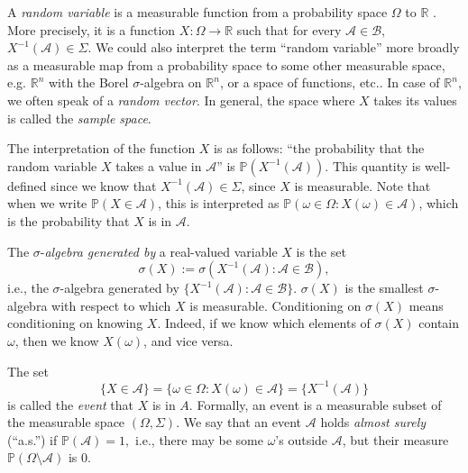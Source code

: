 \documentclass[11pt]{article}
\theoremstyle{plain}
\theoremstyle{definition}
\newtheorem{example}{Example}[section]
\newcommand{\reals}{\mathbb{R}}
\newcommand{\A}{\mathcal{A}}
\newcommand{\pr}{\mathbb{P}}
\newcommand{\citp}{\citep}
\begin{document}
A \emph{random variable} is a measurable function from a probability space $\Omega$ to  $\reals$ \citp{spreij2023measure}. More precisely, it is a function $X: \Omega \rightarrow \reals$ such that for every $\mathcal{A}\in \mathcal{B}$, $X^{-1}( \mathcal{A})\in \Sigma$. We could also interpret the term ``random variable'' more broadly as a measurable map from a probability space to some other measurable space, e.g. $\reals^n$ with the Borel $\sigma$-algebra on  $\reals^n$, or a space of functions, etc..  In case of $\reals^n$, we often speak of a \emph{random vector}. In general, the space where $X$ takes its values is called the \emph{sample space}. %

The interpretation of the function $X$ is as follows:  ``the probability that the random variable $X$ takes a value in $\mathcal{A}$'' is $\pr(X^{-1}( \mathcal{A}))$. This quantity is well-defined since we know that $X^{-1}( \mathcal{A}) \in \Sigma$, since $X$ is measurable. Note that when we write $\pr(X\in \mathcal{A})$, this is interpreted as $\pr(\omega\in \Omega: X(\omega)\in \mathcal{A})$, which is the probability that $X$ is in $\mathcal{A}$.

The $\sigma$-\emph{algebra generated by} a real-valued variable $X$ is the set 
$$\sigma(X):=\sigma(X^{-1}(\mathcal{A}): \mathcal{A}\in \mathcal{B}),$$
i.e., the $\sigma$-algebra generated by $\{X^{-1}(\mathcal{A}): \mathcal{A}\in \mathcal{B}\}$. $\sigma(X)$ is the smallest $\sigma$-algebra with respect to which $X$ is measurable. Conditioning on $\sigma(X)$ means conditioning on knowing $X$. Indeed, if we know which elements of $\sigma(X)$  contain $\omega$, then we know $X(\omega)$, and vice versa.

The set
$$\{X\in \mathcal{A}\}=\{\omega\in \Omega: X(\omega)\in \mathcal{A}\} = \{X^{-1}( \mathcal{A})\}$$ is called the \emph{event} that $X$ is in $A$. Formally, an event is a  measurable subset of the  measurable  space $(\Omega, \Sigma)$. We say that an event $\A$ holds \emph{almost surely} (``a.s.'') if $\pr(\A)=1,$ i.e., there may be some $\omega$'s outside $\A$, but their measure $\pr(\Omega\setminus\A)$ is $0$. 

\end{document}
